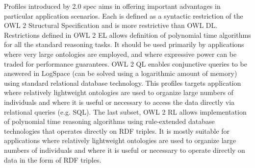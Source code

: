 Profiles introduced by 2.0 spec aims in offering important advantages in particular application scenarios. Each is defined as a syntactic restriction of the OWL 2 Structural Specification and is more restrictive than OWL DL. Restrictions defined in OWL 2 EL allows definition of polynomial time algorithms for all the standard reasoning tasks. It should be used primarily by applications where very large ontologies are employed, and where expressive power can be traded for performance guarantees. OWL 2 QL enables conjunctive queries to be answered in LogSpace (can be solved using a logarithmic amount of memory) using standard relational database technology. This profiles targets application where relatively lightweight ontologies are used to organize large numbers of individuals and where it is useful or necessary to access  the data directly via relational queries (e.g.  SQL). The last subset, OWL 2 RL allows implementation of polynomial time reasoning algorithms using rule-extended database technologies that operates directly on RDF triples. It is mostly suitable for applications where relatively lightweight ontologies are used to organize large numbers of individuals and where it is useful or necessary to operate directly on data in the form of RDF triples.

